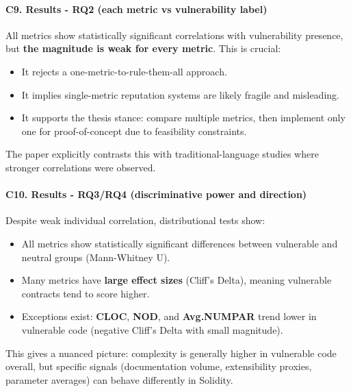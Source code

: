 \documentclass[11pt,a4paper]{article}
\begin{document}
\paragraph{C9. Results - RQ2 (each metric vs vulnerability label)}
All metrics show statistically significant correlations with vulnerability presence, but \textbf{the magnitude is weak for every metric}. This is crucial:
\begin{itemize}[leftmargin=*]
  \item It rejects a one-metric-to-rule-them-all approach.
  \item It implies single-metric reputation systems are likely fragile and misleading.
  \item It supports the thesis stance: compare multiple metrics, then implement only one for proof-of-concept due to feasibility constraints.
\end{itemize}
The paper explicitly contrasts this with traditional-language studies where stronger correlations were observed.

\paragraph{C10. Results - RQ3/RQ4 (discriminative power and direction)}
Despite weak individual correlation, distributional tests show:
\begin{itemize}[leftmargin=*]
  \item All metrics show statistically significant differences between vulnerable and neutral groups (Mann-Whitney U).
  \item Many metrics have \textbf{large effect sizes} (Cliff's Delta), meaning vulnerable contracts tend to score higher.
  \item Exceptions exist: \textbf{CLOC}, \textbf{NOD}, and \textbf{Avg.NUMPAR} trend lower in vulnerable code (negative Cliff's Delta with small magnitude).
\end{itemize}
This gives a nuanced picture: complexity is generally higher in vulnerable code overall, but specific signals (documentation volume, extensibility proxies, parameter averages) can behave differently in Solidity.
\end{document}
